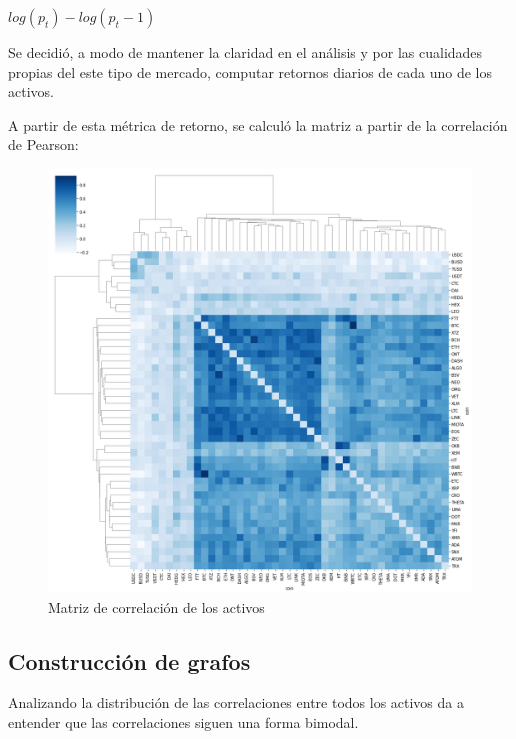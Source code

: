 \documentclass[runningheads,a4paper,10pt]{etc/llncs}
\begin{document}
\begin{math}
log(p_t) -log(p_t-1)
\end{math}

Se decidió, a modo de mantener la claridad en el análisis y por las cualidades
propias del este tipo de mercado, computar retornos diarios de cada uno de los
activos.

A partir de esta métrica de retorno, se calculó la matriz a partir de la correlación de Pearson: 

\begin{figure}[htp]
    \centering
    \includegraphics[scale=0.3]{images/corr_matrix.png}
    \caption{Matriz de correlación de los activos}
    \label{fig:corr_matrix}
\end{figure}


\subsection{Construcción de grafos} 

Analizando la distribución de las correlaciones entre todos los activos da a entender que las correlaciones siguen una forma bimodal.
\end{document}
